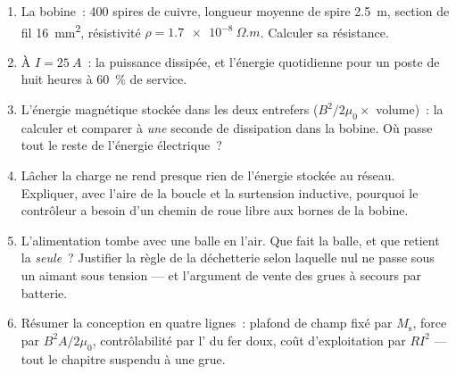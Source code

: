 \begin{problem}
\begin{enumerate}[resume]
  \item La bobine~: 400 spires de cuivre, longueur moyenne de
        spire \qty{2.5}{m}, section de fil \qty{16}{mm^2},
        résistivité $\rho = \qty{1.7e-8}{\Omega.m}$. Calculer sa
        résistance.
  \item À $I = \qty{25}{A}$~: la puissance dissipée, et l'énergie
        quotidienne pour un poste de huit heures à
        \qty{60}{\percent} de service.
  \item L'énergie magnétique stockée dans les deux entrefers
        ($B^2/2\mu_0 \times$ volume)~: la calculer et comparer à
        \emph{une} seconde de dissipation dans la bobine. Où passe
        tout le reste de l'énergie électrique~?
  \item Lâcher la charge ne rend presque rien de l'énergie stockée
        au réseau. Expliquer, avec l'aire de la boucle et la
        surtension inductive, pourquoi le contrôleur a besoin d'un
        chemin de roue libre aux bornes de la bobine.
  \item L'alimentation tombe avec une balle en l'air. Que fait la
        balle, et que retient la  \emph{seule}~? Justifier
        la règle de la déchetterie selon laquelle nul ne passe sous
        un aimant sous tension --- et l'argument de vente des
        grues à secours par batterie.
  \item Résumer la conception en quatre lignes~: plafond de champ
        fixé par $M_{\text{s}}$, force par $B^2A/2\mu_0$,
        contrôlabilité par l' du fer doux, coût
        d'exploitation par $RI^2$ --- tout le chapitre suspendu à
        une grue.
\end{enumerate}
\end{problem}
